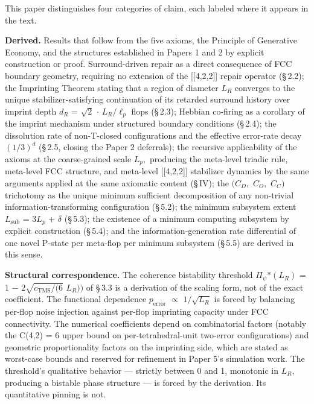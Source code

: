 \documentclass[11pt,oneside]{report}
\theoremstyle{definition}
\theoremstyle{remark}
\begin{document}
This paper distinguishes four categories of claim, each labeled where it
appears in the text.

\textbf{Derived.} Results that follow from the five axioms, the
Principle of Generative Economy, and the structures established in
Papers 1 and 2 by explicit construction or proof. Surround-driven repair
as a direct consequence of FCC boundary geometry, requiring no extension
of the [[4,2,2]] repair operator (\S\,2.2); the Imprinting Theorem
stating that a region of diameter \ensuremath{L_{R}} converges to the unique
stabilizer-satisfying continuation of its retarded surround history over
imprint depth \ensuremath{d_{R}} = \ensuremath{\sqrt{2}} \ensuremath{\cdot} \ensuremath{L_{R}/\ell_{p}} flops (\S\,2.3); Hebbian co-firing as a
corollary of the imprint mechanism under structured boundary conditions
(\S\,2.4); the dissolution rate of non-T-closed configurations and the
effective error-rate decay \ensuremath{(1/3)^{d}} (\S\,2.5, closing the Paper 2
deferrals); the recursive applicability of the axioms at the
coarse-grained scale \ensuremath{L_{p},} producing the meta-level triadic rule,
meta-level FCC structure, and meta-level [[4,2,2]] stabilizer
dynamics by the same arguments applied at the same axiomatic content
(\S\,IV); the \ensuremath{(C_{D},} \ensuremath{C_{O},} \ensuremath{C_{C})} trichotomy as the unique minimum
sufficient decomposition of any non-trivial information-transforming
configuration (\S\,5.2); the minimum subsystem extent \ensuremath{L_{\mathrm{sub}}} = \ensuremath{3L_{p}} + \ensuremath{\delta}
(\S\,5.3); the existence of a minimum computing subsystem by explicit
construction (\S\,5.4); and the information-generation rate differential of
one novel P-state per meta-flop per minimum subsystem (\S\,5.5) are derived
in this sense.

\textbf{Structural correspondence.} The coherence bistability threshold
\textbar \ensuremath{\Pi_{\psi}}\textbar\ensuremath{*(L_{R})} = 1 \ensuremath{-} \ensuremath{2\sqrt{c_{\mathrm{TMS}}/(6}} \ensuremath{L_{R}))} of \S\,3.3 is a
derivation of the scaling form, not of the exact coefficient. The
functional dependence \ensuremath{p_{\mathrm{error}}} \ensuremath{\propto} \ensuremath{1/\sqrt{L_{R}}} is forced by balancing per-flop
noise injection against per-flop imprinting capacity under FCC
connectivity. The numerical coefficients depend on combinatorial factors
(notably the C(4,2) = 6 upper bound on per-tetrahedral-unit two-error
configurations) and geometric proportionality factors on the imprinting
side, which are stated as worst-case bounds and reserved for refinement
in Paper 5's simulation work. The threshold's qualitative behavior ---
strictly between 0 and 1, monotonic in \ensuremath{L_{R},} producing a bistable phase
structure --- is forced by the derivation. Its quantitative pinning is
not.
\end{document}
